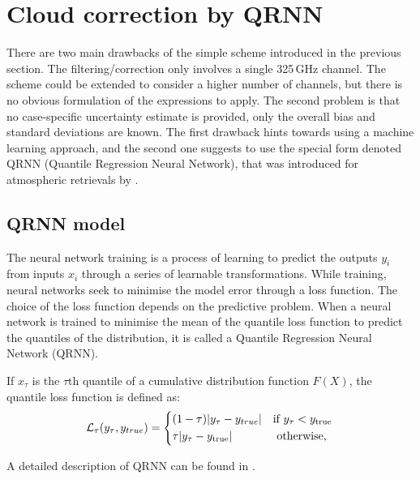 \documentclass[12pt]{article}
\begin{document}
\section{Cloud correction by QRNN}
%
\label{sec:qrnn}
There are two main drawbacks of the simple scheme introduced in the previous
section. The filtering/correction only involves a single 325\,GHz channel. The
scheme could be extended to consider a higher number of channels, but there is
no obvious formulation of the expressions to apply. The second problem is that
no case-specific uncertainty estimate is provided, only the overall bias and
standard deviations are known. The first drawback hints towards using a machine
learning approach, and the second one suggests to use the special form denoted
QRNN (Quantile Regression Neural Network), that was introduced for atmospheric
retrievals by \citet{pfreundschuh:aneur:18}.

\subsection{QRNN model}
%
The neural network training is a process of learning to predict the outputs {$y_i$} from inputs {$x_i$} through a series of learnable transformations. While training, neural networks seek to minimise the model error through a loss function. The choice of the loss function depends on the predictive problem. When a neural network is trained to minimise the mean of the quantile loss function to predict the quantiles of the distribution, it is called a Quantile Regression Neural Network (QRNN). 

If $x_{\tau}$ is the $\tau$th quantile of a cumulative distribution function $F(X)$, the quantile loss function is defined as:
\begin{equation}
\mathcal{L}_\tau(y_\tau, y_{true}) =
\begin{cases*}
(1 - \tau)|y_\tau - y_{true}| &\text{if}  $y_\tau < y_\text{true}$\\
\tau |y_\tau - y_\text{true}| & \text{ otherwise, }
\end{cases*}
\label{loss_function}
\end{equation}

A detailed description of QRNN can be found in \citet{pfreundschuh:aneur:18}.  
\end{document}
